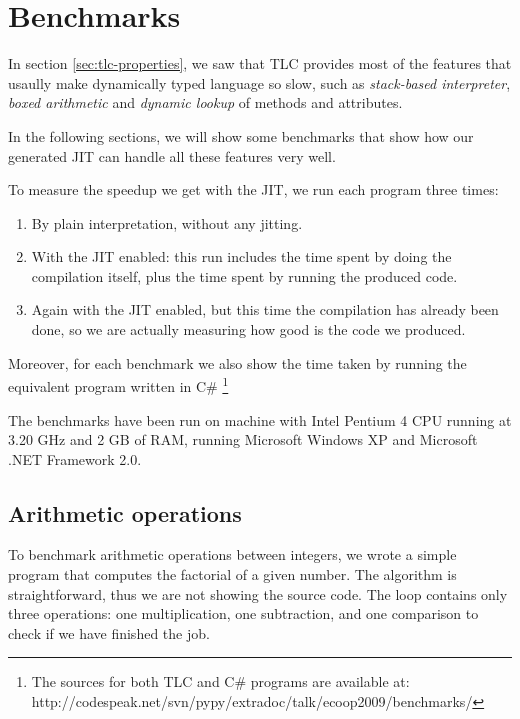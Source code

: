 \section{Benchmarks}
\label{sec:benchmarks}


In section \ref{sec:tlc-properties}, we saw that TLC provides most of the
features that usaully make dynamically typed language so slow, such as
\emph{stack-based interpreter}, \emph{boxed arithmetic} and \emph{dynamic lookup} of
methods and attributes.

In the following sections, we will show some benchmarks that show how our
generated JIT can handle all these features very well.

To measure the speedup we get with the JIT, we run each program three times:

\begin{enumerate}
\item By plain interpretation, without any jitting.
\item With the JIT enabled: this run includes the time spent by doing the
  compilation itself, plus the time spent by running the produced code.
\item Again with the JIT enabled, but this time the compilation has already
  been done, so we are actually measuring how good is the code we produced.
\end{enumerate}

Moreover, for each benchmark we also show the time taken by running the
equivalent program written in C\# \footnote{The sources for both TLC and C\#
  programs are available at:
  http://codespeak.net/svn/pypy/extradoc/talk/ecoop2009/benchmarks/}

The benchmarks have been run on machine with Intel Pentium 4 CPU running at
3.20 GHz and 2 GB of RAM, running Microsoft Windows XP and Microsoft .NET
Framework 2.0.

\subsection{Arithmetic operations}

To benchmark arithmetic operations between integers, we wrote a simple program
that computes the factorial of a given number.  The algorithm is
straightforward, thus we are not showing the source code.  The loop contains only three operations: one
multiplication, one subtraction, and one comparison to check if we have
finished the job.

